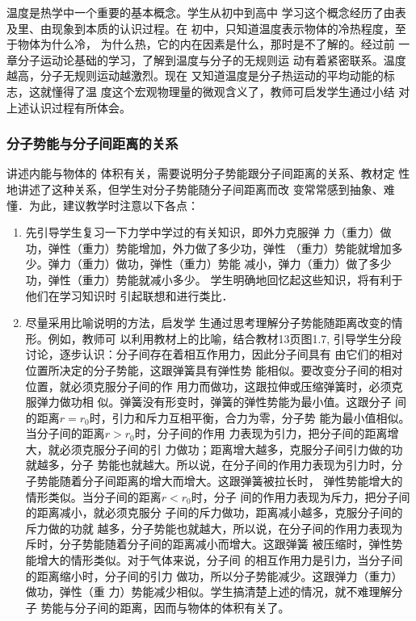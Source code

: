 温度是热学中一个重要的基本概念。学生从初中到高中
学习这个概念经历了由表及里、由现象到本质的认识过程。在
初中，只知道温度表示物体的冷热程度，至于物体为什么冷，
为什么热，它的内在因素是什么，那时是不了解的。经过前
一章分子运动论基础的学习，了解到温度与分子的无规则运
动有着紧密联系。温度越高，分子无规则运动越激烈。现在
又知道温度是分子热运动的平均动能的标志，这就懂得了温
度这个宏观物理量的微观含义了，教师可启发学生通过小结
对上述认识过程有所体会。

\subsubsection{分子势能与分子间距离的关系} 讲述内能与物体的
体积有关，需要说明分子势能跟分子间距离的关系、教材定
性地讲述了这种关系，但学生对分子势能随分子间距离而改
变常常感到抽象、难懂．为此，建议教学时注意以下各点：
\begin{enumerate}
\item 
先引导学生复习一下力学中学过的有关知识，即外力克服弹
力（重力）做功，弹性（重力）势能增加，外力做了多少功，弹性
（重力）势能就增加多少。弹力（重力）做功，弹性（重力）势能
减小，弹力（重力）做了多少功，弹性（重力）势能就减小多少。
学生明确地回忆起这些知识，将有利于他们在学习知识时
引起联想和进行类比．    
\item 尽量采用比喻说明的方法，启发学
生通过思考理解分子势能随距离改变的情形。例如，教师可
以利用教材上的比喻，结合教材13页图1.7, 引导学生分段
讨论，逐步认识：分子间存在着相互作用力，因此分子间具有
由它们的相对位置所决定的分子势能，这跟弹簧具有弹性势
能相似。要改变分子间的相对位置，就必须克服分子间的作
用力而做功，这跟拉伸或压缩弹簧时，必须克服弹力做功相
似。弹簧没有形变时，弹簧的弹性势能为最小值。这跟分子
间的距离$r=r_0$时，引力和斥力互相平衡，合力为零，分子势
能为最小值相似。当分子间的距离$r>r_0$时，分子间的作用
力表现为引力，把分子间的距离增大，就必须克服分子间的引
力做功；距离增大越多，克服分子间引力做的功就越多，分子
势能也就越大。所以说，在分子间的作用力表现为引力时，分
子势能随着分子间距离的增大而增大。这跟弹簧被拉长时，
弹性势能增大的情形类似。当分子间的距离$r<r_0$时，分子
间的作用力表现为斥力，把分子间的距离减小，就必须克服分
子间的斥力做功，距离减小越多，克服分子间的斥力做的功就
越多，分子势能也就越大，所以说，在分子间的作用力表现为
斥时，分子势能随着分子间的距离减小而增大。这跟弹簧
被压缩时，弹性势能增大的情形类似。对于气体来说，分子间
的相互作用力是引力，当分子间的距离缩小时，分子间的引力
做功，所以分子势能减少。这跟弹力（重力）做功，弹性（重
力）势能减少相似。学生搞清楚上述的情况，就不难理解分子
势能与分子间的距离，因而与物体的体积有关了。
\end{enumerate}

